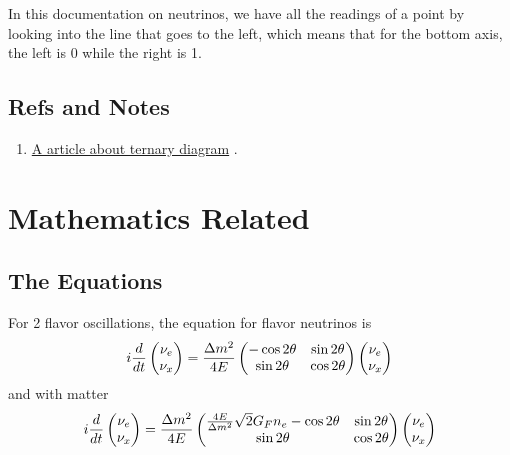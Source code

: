 \documentclass[letterpaper,12pt,english]{sphinxmanual}
\begin{document}
In this documentation on neutrinos, we have all the readings of a point by looking into the line that goes to the left, which means that for the bottom axis, the left is 0 while the right is 1.


\section{Refs and Notes}
\label{commonsense:refs-and-notes}\begin{enumerate}
\item {} 
\href{http://petrowiki.org/Ternary\_phase\_diagrams}{A article about ternary diagram} .

\end{enumerate}


\chapter{Mathematics Related}
\label{math::doc}\label{math:mathematics-related}

\section{The Equations}
\label{math:the-equations}
For 2 flavor oscillations, the equation for flavor neutrinos is
\begin{gather}
\begin{split}i \frac{d}{dt} \begin{pmatrix} \nu_e \\ \nu_x \end{pmatrix} = \frac{\Delta m^2}{4E} \begin{pmatrix} - \cos 2\theta & \sin 2\theta \\  \sin 2\theta  & \cos 2\theta   \end{pmatrix} \begin{pmatrix} \nu_e \\ \nu_x \end{pmatrix}\end{split}\notag
\end{gather}
and with matter
\begin{gather}
\begin{split}i \frac{d}{dt} \begin{pmatrix} \nu_e \\ \nu_x \end{pmatrix} = \frac{\Delta m^2}{4E} \begin{pmatrix} \frac{4E}{\Delta m^2} \sqrt{2} G_F n_e - \cos 2\theta   & \sin 2\theta \\  \sin 2\theta  &  \cos 2\theta   \end{pmatrix} \begin{pmatrix} \nu_e \\ \nu_x \end{pmatrix}\end{split}\notag
\end{gather}
\end{document}
